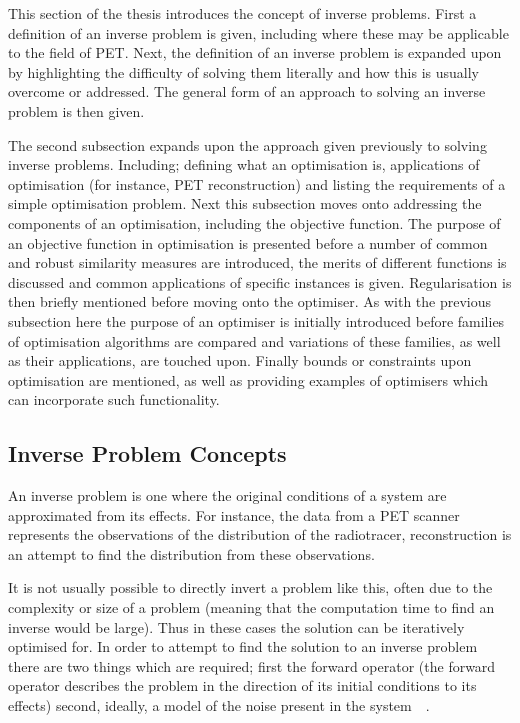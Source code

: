         This section of the thesis introduces the concept of inverse problems. First a definition of an inverse problem is given, including where these may be applicable to the field of \gls{PET}. Next, the definition of an inverse problem is expanded upon by highlighting the difficulty of solving them literally and how this is usually overcome or addressed. The general form of an approach to solving an inverse problem is then given.
            
        The second subsection expands upon the approach given previously to solving inverse problems. Including; defining what an optimisation is, applications of optimisation (for instance, \gls{PET} reconstruction) and listing the requirements of a simple optimisation problem. Next this subsection moves onto addressing the components of an optimisation, including the objective function. The purpose of an objective function in optimisation is presented before a number of common and robust similarity measures are introduced, the merits of different functions is discussed and common applications of specific instances is given. Regularisation is then briefly mentioned before moving onto the optimiser. As with the previous subsection here the purpose of an optimiser is initially introduced before families of optimisation algorithms are compared and variations of these families, as well as their applications, are touched upon. Finally bounds or constraints upon optimisation are mentioned, as well as providing examples of optimisers which can incorporate such functionality.
        
        \subsection{Inverse Problem Concepts} \label{sec:inverse_problem_concepts}
            An inverse problem is one where the original conditions of a system are approximated from its effects. For instance, the data from a \gls{PET} scanner represents the observations of the distribution of the radiotracer, reconstruction is an attempt to find the distribution from these observations.
            
            It is not usually possible to directly invert a problem like this, often due to the complexity or size of a problem (meaning that  the computation time to find an inverse would be large). Thus in these cases the solution can be iteratively optimised for. In order to attempt to find the solution to an inverse problem there are two things which are required; first the forward operator (the forward operator describes the problem in the direction of its initial conditions to its effects) %
            second, ideally, a model of the noise present in the system~~. %
        
